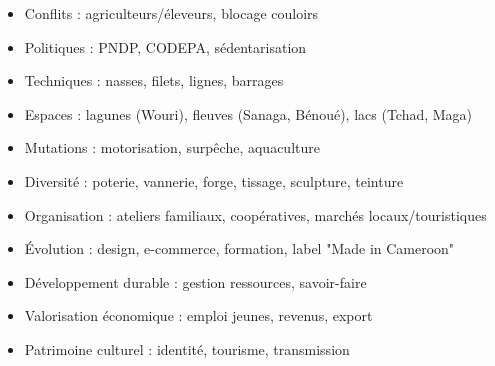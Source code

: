 \documentclass[11pt]{article}
\begin{document}
\begin{popfigure}
\begin{tcbraster}[raster columns=3,raster equal height=rows,raster column skip=6pt,raster row skip=6pt,enhanced,blankest]
\begin{tcolorbox}
\begin{itemize}[nosep,leftmargin=*,itemsep=1pt,font=\scriptsize]
\item Conflits : agriculteurs/éleveurs, blocage couloirs
\item Politiques : PNDP, CODEPA, sédentarisation
\end{itemize}
\end{tcolorbox}
\begin{tcolorbox}[enhanced,colback=white,colframe=popblue,boxrule=0.9pt,arc=3pt,title={\textbf{3. Pêche traditionnelle}},fonttitle=\bfseries\scriptsize,coltitle=white,colbacktitle=popblue,left=4pt,right=4pt,top=2pt,bottom=2pt,boxsep=1pt,toptitle=1.5pt,bottomtitle=1.5pt,halign=left]
\begin{itemize}[nosep,leftmargin=*,itemsep=1pt,font=\scriptsize]
\item Techniques : nasses, filets, lignes, barrages
\item Espaces : lagunes (Wouri), fleuves (Sanaga, Bénoué), lacs (Tchad, Maga)
\item Mutations : motorisation, surpêche, aquaculture
\end{itemize}
\end{tcolorbox}
\begin{tcolorbox}[enhanced,colback=white,colframe=poppurple,boxrule=0.9pt,arc=3pt,title={\textbf{4. Artisanat traditionnel}},fonttitle=\bfseries\scriptsize,coltitle=white,colbacktitle=poppurple,left=4pt,right=4pt,top=2pt,bottom=2pt,boxsep=1pt,toptitle=1.5pt,bottomtitle=1.5pt,halign=left]
\begin{itemize}[nosep,leftmargin=*,itemsep=1pt,font=\scriptsize]
\item Diversité : poterie, vannerie, forge, tissage, sculpture, teinture
\item Organisation : ateliers familiaux, coopératives, marchés locaux/touristiques
\item Évolution : design, e-commerce, formation, label "Made in Cameroon"
\end{itemize}
\end{tcolorbox}
\begin{tcolorbox}[enhanced,colback=white,colframe=poppink,boxrule=0.9pt,arc=3pt,title={\textbf{5. Enjeux transversaux}},fonttitle=\bfseries\scriptsize,coltitle=white,colbacktitle=poppink,left=4pt,right=4pt,top=2pt,bottom=2pt,boxsep=1pt,toptitle=1.5pt,bottomtitle=1.5pt,halign=left]
\begin{itemize}[nosep,leftmargin=*,itemsep=1pt,font=\scriptsize]
\item Développement durable : gestion ressources, savoir-faire
\item Valorisation économique : emploi jeunes, revenus, export
\item Patrimoine culturel : identité, tourisme, transmission
\end{itemize}
\end{tcolorbox}
\end{tcbraster}


\end{popfigure}
\end{document}
